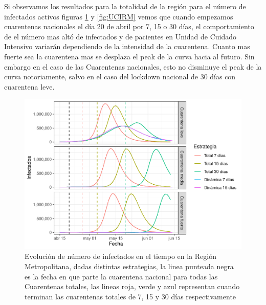 \documentclass[]{article}
\begin{document}
Si observamos los resultados para la totalidad de la región para el número de infectados activos figuras \ref{fig:InfectadosRM} y \ref{fig:UCIRM} vemos que cuando empezamos cuarentenas nacionales el día 20 de abril por 7, 15 o 30 días, el comportamiento de el número mas altó de infectados y de pacientes en Unidad de Cuidado Intensivo variarán dependiendo de la intensidad de la cuarentena. Cuanto mas fuerte sea la cuarentena mas se desplaza el peak de la curva hacia al futuro. Sin embargo en el caso de las Cuarentenas nacionales, esto no disminuye el peak de la curva notoriamente, salvo en el caso del lockdown nacional de 30 días con cuarentena leve.

\begin{figure}
\centering
\includegraphics{Informe_Mesa_2020_04_16_files/figure-latex/InfectadosRM-1.pdf}
\caption{\label{fig:InfectadosRM}Evolución de número de infectados en el tiempo en la Región Metropolitana, dadas distintas estrategias, la linea punteada negra es la fecha en que parte la cuarentena nacional para todas las Cuarentenas totales, las lineas roja, verde y azul representan cuando terminan las cuarentenas totales de 7, 15 y 30 días respectivamente}
\end{figure}
\end{document}
